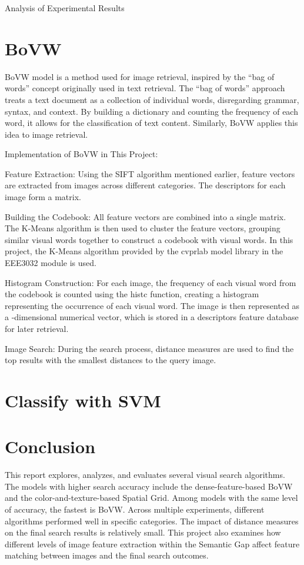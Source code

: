 \documentclass{article}
\begin{document}
Analysis of Experimental Results

\section{BoVW}

BoVW model is a method used for image retrieval, inspired by the “bag of words” concept originally used in text retrieval. The “bag of words” approach treats a text document as a collection of individual words, disregarding grammar, syntax, and context. By building a dictionary and counting the frequency of each word, it allows for the classification of text content. Similarly, BoVW applies this idea to image retrieval.



Implementation of BoVW in This Project:

Feature Extraction: Using the SIFT algorithm mentioned earlier, feature vectors are extracted from images across different categories. The descriptors for each image form a matrix.

​Building the Codebook: All feature vectors are combined into a single matrix. The K-Means algorithm is then used to cluster the feature vectors, grouping similar visual words together to construct a codebook with visual words. In this project, the K-Means algorithm provided by the cvprlab model library in the EEE3032 module is used.

​Histogram Construction: For each image, the frequency of each visual word from the codebook is counted using the histc function, creating a histogram representing the occurrence of each visual word. The image is then represented as a -dimensional numerical vector, which is stored in a descriptors feature database for later retrieval.

Image Search: During the search process, distance measures are used to find the top results with the smallest distances to the query image.


\section{Classify with SVM}


\section{Conclusion}

This report explores, analyzes, and evaluates several visual search algorithms. The models with higher search accuracy include the dense-feature-based BoVW and the color-and-texture-based Spatial Grid. Among models with the same level of accuracy, the fastest is BoVW. Across multiple experiments, different algorithms performed well in specific categories. The impact of distance measures on the final search results is relatively small. This project also examines how different levels of image feature extraction within the Semantic Gap affect feature matching between images and the final search outcomes.


\newcommand{\doi}[1]{DOI: \href{http://dx.doi.org/#1}{\nolinkurl{#1}}}



\end{document}
